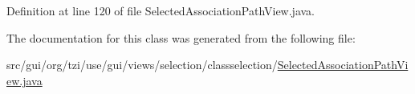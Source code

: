 Definition at line 120 of file Selected\-Association\-Path\-View.\-java.



The documentation for this class was generated from the following file\-:\begin{DoxyCompactItemize}
\item 
src/gui/org/tzi/use/gui/views/selection/classselection/\hyperlink{_selected_association_path_view_8java}{Selected\-Association\-Path\-View.\-java}\end{DoxyCompactItemize}
